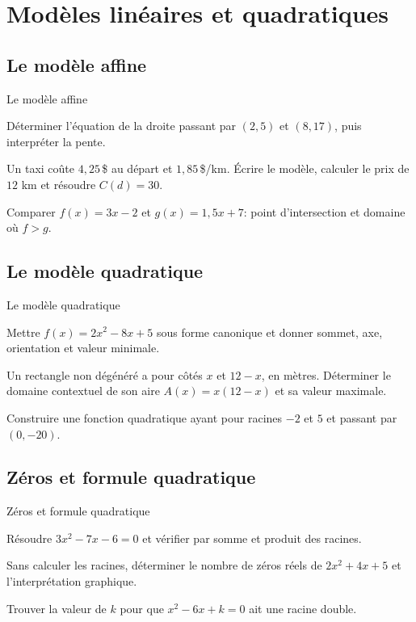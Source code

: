\chapter{Modèles linéaires et quadratiques}
\label{workbook:chapter:04}
\section{Le modèle affine}
\label{workbook:section:04.01}
\begin{exerciseblock}{Le modèle affine}
\item Déterminer l'équation de la droite passant par $(2,5)$ et $(8,17)$, puis interpréter la pente.
\item Un taxi coûte $4{,}25\,$\$ au départ et $1{,}85\,$\$/km. Écrire le modèle, calculer le prix de $12$ km et résoudre $C(d)=30$.
\item Comparer $f(x)=3x-2$ et $g(x)=1{,}5x+7$: point d'intersection et domaine où $f>g$.
\end{exerciseblock}
\section{Le modèle quadratique}
\label{workbook:section:04.02}
\begin{exerciseblock}{Le modèle quadratique}
\item Mettre $f(x)=2x^2-8x+5$ sous forme canonique et donner sommet, axe, orientation et valeur minimale.
\item Un rectangle non dégénéré a pour côtés $x$ et $12-x$, en mètres. Déterminer le domaine contextuel de son aire $A(x)=x(12-x)$ et sa valeur maximale.
\item Construire une fonction quadratique ayant pour racines $-2$ et $5$ et passant par $(0,-20)$.
\end{exerciseblock}
\section{Zéros et formule quadratique}
\label{workbook:section:04.03}
\begin{exerciseblock}{Zéros et formule quadratique}
\item Résoudre $3x^2-7x-6=0$ et vérifier par somme et produit des racines.
\item Sans calculer les racines, déterminer le nombre de zéros réels de $2x^2+4x+5$ et l'interprétation graphique.
\item Trouver la valeur de $k$ pour que $x^2-6x+k=0$ ait une racine double.
\end{exerciseblock}
